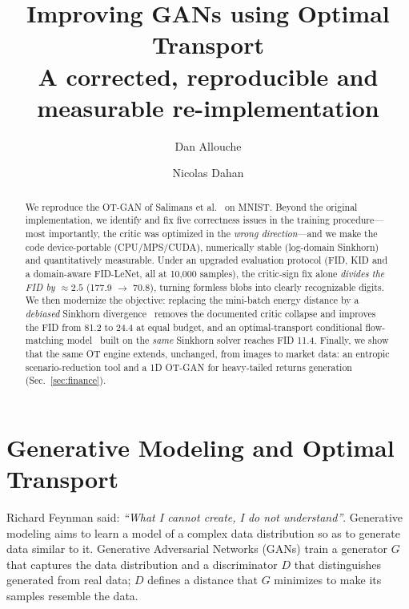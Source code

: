 \documentclass[10pt,twocolumn]{article}
\title{\vspace{-1.0cm}\textbf{Improving GANs using Optimal Transport}\\
\large A corrected, reproducible and measurable re-implementation}
\author[]{Dan Allouche}
\author[]{Nicolas Dahan}
\affil[]{\small ENSAE Paris, Palaiseau, France \\ \texttt{dan.allouche@ensae.fr} \quad \texttt{nicolas.dahan@ensae.fr}}
\affil[]{\footnotesize Originally ENSAE coursework (2021); corrected, modernized and extended (2026)}
\date{}
\begin{document}
\maketitle

\begin{abstract}
\noindent We reproduce the OT-GAN of Salimans et al.~\cite{salimans2018} on MNIST.
Beyond the original implementation, we identify and fix five correctness issues in the
training procedure---most importantly, the critic was optimized in the \emph{wrong
direction}---and we make the code device-portable (CPU/MPS/CUDA), numerically stable
(log-domain Sinkhorn) and quantitatively measurable. Under an upgraded evaluation
protocol (FID, KID and a domain-aware FID-LeNet, all at 10{,}000 samples), the
critic-sign fix alone \emph{divides the FID by $\approx 2.5$} (177.9 $\rightarrow$ 70.8),
turning formless blobs into clearly recognizable digits. We then modernize the
objective: replacing the mini-batch energy distance by a \emph{debiased} Sinkhorn
divergence~\cite{genevay2018,feydy2019} removes the documented critic collapse and
improves the FID from 81.2 to 24.4 at equal budget, and an optimal-transport
conditional flow-matching model~\cite{tong2024} built on the \emph{same} Sinkhorn
solver reaches FID 11.4. Finally, we show that the same OT engine extends, unchanged,
from images to market data: an entropic scenario-reduction tool and a 1D OT-GAN for
heavy-tailed returns generation (Sec.~\ref{sec:finance}).
\end{abstract}

\section{Generative Modeling and Optimal Transport}
Richard Feynman said: \emph{``What I cannot create, I do not understand''}. Generative
modeling aims to learn a model of a complex data distribution so as to generate data
similar to it. Generative Adversarial Networks (GANs) train a generator $G$ that captures
the data distribution and a discriminator $D$ that distinguishes generated from real data;
$D$ defines a distance that $G$ minimizes to make its samples resemble the data.
\end{document}
